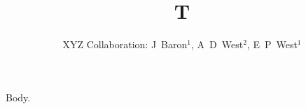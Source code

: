 \documentclass{iopart}
\begin{document}
\title{T}
\author{XYZ Collaboration: J~Baron$^1$, A~D~West$^2$, E~P~West$^1$}
\address{$^1$Univ A, $^2$Univ B}
\maketitle
Body.
\end{document}
